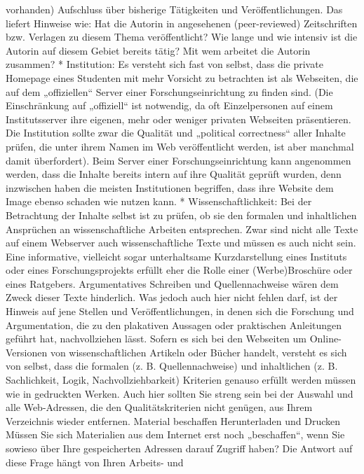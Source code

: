 \documentclass[]{book}
\theoremstyle{definition}
\theoremstyle{definition}
\theoremstyle{definition}
\theoremstyle{remark}
\begin{document}
vorhanden) Aufschluss über bisherige Tätigkeiten und Veröffentlichungen.
Das liefert Hinweise wie: Hat die Autorin in angesehenen (peer-reviewed)
Zeitschriften bzw. Verlagen zu diesem Thema veröffentlicht? Wie lange
und wie intensiv ist die Autorin auf diesem Gebiet bereits tätig? Mit
wem arbeitet die Autorin zusammen? * Institution: Es versteht sich fast
von selbst, dass die private Homepage eines Studenten mit mehr Vorsicht
zu betrachten ist als Webseiten, die auf dem „offiziellen`` Server einer
Forschungseinrichtung zu finden sind. (Die Einschränkung auf
„offiziell`` ist notwendig, da oft Einzelpersonen auf einem
Institutsserver ihre eigenen, mehr oder weniger privaten Webseiten
präsentieren. Die Institution sollte zwar die Qualität und „political
correctness`` aller Inhalte prüfen, die unter ihrem Namen im Web
veröffentlicht werden, ist aber manchmal damit überfordert). Beim Server
einer Forschungseinrichtung kann angenommen werden, dass die Inhalte
bereits intern auf ihre Qualität geprüft wurden, denn inzwischen haben
die meisten Institutionen begriffen, dass ihre Website dem Image ebenso
schaden wie nutzen kann. * Wissenschaftlichkeit: Bei der Betrachtung der
Inhalte selbst ist zu prüfen, ob sie den formalen und inhaltlichen
Ansprüchen an wissenschaftliche Arbeiten entsprechen. Zwar sind nicht
alle Texte auf einem Webserver auch wissenschaftliche Texte und müssen
es auch nicht sein. Eine informative, vielleicht sogar unterhaltsame
Kurzdarstellung eines Instituts oder eines Forschungsprojekts erfüllt
eher die Rolle einer (Werbe)Broschüre oder eines Ratgebers.
Argumentatives Schreiben und Quellennachweise wären dem Zweck dieser
Texte hinderlich. Was jedoch auch hier nicht fehlen darf, ist der
Hinweis auf jene Stellen und Veröffentlichungen, in denen sich die
Forschung und Argumentation, die zu den plakativen Aussagen oder
praktischen Anleitungen geführt hat, nachvollziehen lässt. Sofern es
sich bei den Webseiten um Online-Versionen von wissenschaftlichen
Artikeln oder Bücher handelt, versteht es sich von selbst, dass die
formalen (z. B. Quellennachweise) und inhaltlichen (z. B. Sachlichkeit,
Logik, Nachvollziehbarkeit) Kriterien genauso erfüllt werden müssen wie
in gedruckten Werken. Auch hier sollten Sie streng sein bei der Auswahl
und alle Web-Adressen, die den Qualitätskriterien nicht genügen, aus
Ihrem Verzeichnis wieder entfernen. Material beschaffen Herunterladen
und Drucken Müssen Sie sich Materialien aus dem Internet erst noch
„beschaffen``, wenn Sie sowieso über Ihre gespeicherten Adressen darauf
Zugriff haben? Die Antwort auf diese Frage hängt von Ihren Arbeits- und
\end{document}
